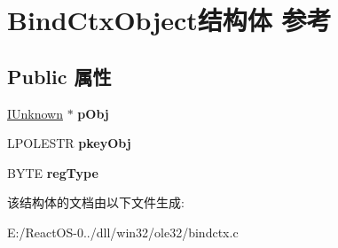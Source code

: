 \hypertarget{struct_bind_ctx_object}{}\section{Bind\+Ctx\+Object结构体 参考}
\label{struct_bind_ctx_object}
\subsection*{Public 属性}
\begin{DoxyCompactItemize}
\item 
\mbox{\label{struct_bind_ctx_object_adc359931a93151dc50f7237126f6d42b}} 
\hyperlink{interface_i_unknown}{I\+Unknown} $\ast$ {\bfseries p\+Obj}
\item 
\mbox{\label{struct_bind_ctx_object_adba10a393344e51abf5b3a3ef90c1eef}} 
L\+P\+O\+L\+E\+S\+TR {\bfseries pkey\+Obj}
\item 
\mbox{\label{struct_bind_ctx_object_a86bd0aa078362e0e37935983547018ac}} 
B\+Y\+TE {\bfseries reg\+Type}
\end{DoxyCompactItemize}


该结构体的文档由以下文件生成\+:\begin{DoxyCompactItemize}
\item 
E\+:/\+React\+O\+S-\/0../dll/win32/ole32/bindctx.\+c\end{DoxyCompactItemize}
